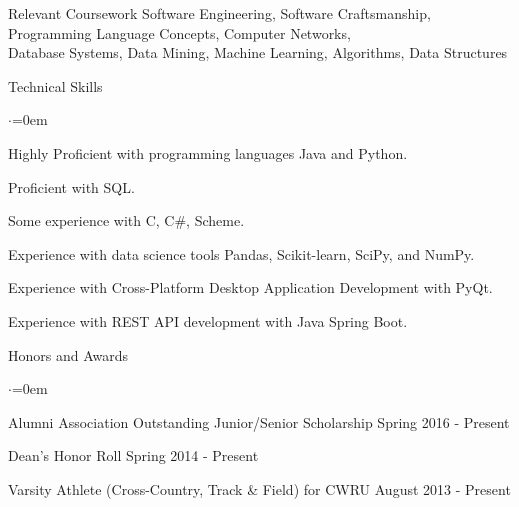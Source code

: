 \documentclass{resume} %
\begin{document}

\begin{rSection}{Relevant Coursework}
Software Engineering, Software Craftsmanship, Programming Language Concepts, Computer Networks, \\
Database Systems, Data Mining, Machine Learning, Algorithms, Data Structures
\end{rSection}



\begin{rSection}{Technical Skills}
\begin{list}{$\cdot$}{\leftmargin=0em}
\item Highly Proficient with programming languages Java and Python.
\vspace{-0.5em}
\item Proficient with SQL.
\vspace{-0.5em}
\item Some experience with C, C\#, Scheme.
\vspace{-0.5em}
\item Experience with data science tools Pandas, Scikit-learn, SciPy, and NumPy.
\vspace{-0.5em}
\item Experience with Cross-Platform Desktop Application Development with PyQt.
\vspace{-0.5em}
\item Experience with REST API development with Java Spring Boot.
\vspace{-0.5em}
\end{list}
\end{rSection}


\begin{rSection}{Honors and Awards}
\begin{list}{$\cdot$}{\leftmargin=0em}
\item Alumni Association Outstanding Junior/Senior Scholarship \hfill Spring 2016 - Present
\vspace{-0.5em}
\item Dean's Honor Roll \hfill Spring 2014 - Present
\vspace{-0.5em}
\item Varsity Athlete (Cross-Country, Track \& Field) for CWRU \hfill{August 2013 - Present}
\vspace{-0.5em}
\end{list}


\end{rSection}

\end{document}

